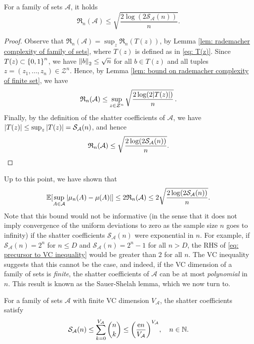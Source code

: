 \begin{proposition}
\label{prop: bound on rademacher complexity of family of sets}
For a family of sets $\mathcal{A}$, it holds
\[
    \mathfrak{R}_n(\mathcal{A}) \leq \sqrt{\frac{2 \log(2 \mathcal{S}_{\mathcal{A}}(n)) }{n}}.
\]
\end{proposition}

\begin{proof}
Observe that $\mathfrak{R}_n(\mathcal{A}) = \sup_z \mathfrak{R}_n(T(z))$, by Lemma \ref{lem: rademacher complexity of family of sets}, where $T(z)$ is defined as in \eqref{eq: T(z)}. Since $T(z) \subset \set{0, 1}^n$, we have $\norm{b}_2 \leq \sqrt{n}$ for all $b \in T(z)$ and all tuples $z = (z_1, \dots, z_n) \in \mathcal{Z}^n$. Hence, by Lemma \ref{lem: bound on rademacher complexity of finite set}, we have
\[
    \mathfrak{R}_n(\mathcal{A}) \leq \sup_{z \in \mathcal{Z}^n} \sqrt{\frac{2 \log(2 \abs{T(z)})}{n}} \, .
\]
Finally, by the definition of the shatter coefficients of $\mathcal{A}$, we have $\abs{T(z)} \leq \sup_z \abs{T(z)} = \mathcal{S}_{\mathcal{A}}(n)$, and hence
\[
    \mathfrak{R}_n(\mathcal{A}) \leq \sqrt{\frac{2 \log(2 \mathcal{S}_{\mathcal{A}}(n)) }{n}}. \qedhere
\]
\end{proof}

Up to this point, we have shown that
\begin{equation}
\label{eq: precursor to VC inequality}
    \operatorname{\mathbb{E}}[\sup_{A \in \mathcal{A}} \abs{\mu_n(A) - \mu(A)}] \leq 2 \mathfrak{R}_n(\mathcal{A}) \leq 2 \sqrt{\frac{2 \log(2 \mathcal{S}_{\mathcal{A}}(n))}{n}}.
\end{equation}
Note that this bound would not be informative (in the sense that it does not imply convergence of the uniform deviations to zero as the sample size $n$ goes to infinity) if the shatter coefficients $\mathcal{S}_{\mathcal{A}}(n)$ were exponential in $n$. For example, if $\mathcal{S}_{\mathcal{A}}(n) = 2^n$ for $n \leq D$ and $\mathcal{S}_{\mathcal{A}}(n) = 2^n - 1$ for all $n > D$, the RHS of \eqref{eq: precursor to VC inequality} would be greater than $2$ for all $n$. The VC inequality suggests that this cannot be the case, and indeed, if the VC dimension of a family of sets is \emph{finite}, the shatter coefficients of $\mathcal{A}$ can be at most \emph{polynomial} in $n$. This result is known as the Sauer-Shelah lemma, which we now turn to.

\begin{lemma}
For a family of sets $\mathcal{A}$ with finite VC dimension $V_{\mathcal{A}}$, the shatter coefficients satisfy
\[
    \mathcal{S}_{\mathcal{A}}(n) \leq \sum_{k=0}^{V_{\mathcal{A}}} \binom{n}{k} \leq \left(\frac{\e n}{V_{\mathcal{A}}}\right)^{V_{\mathcal{A}}}, \quad n \in \N.
\]
\end{lemma}

